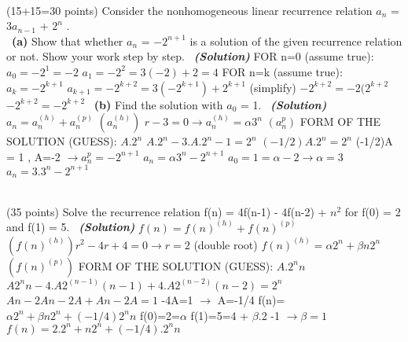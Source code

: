 \documentclass[a4 paper]{article}
\numberwithin{equation}{section}
\newcommand{\problem}[2]{~\\\fbox{\textbf{Problem #1}}\hfill (#2 points)\newline\newline}
\newcommand{\subproblem}[1]{~\newline\textbf{(#1)}}
\newcommand{\solution}{~\newline\textbf{\textit{(Solution)}} }
\newcommand{\0}{\mathbf{0}}
\begin{document}
\problem{1}{15+15=30}
Consider the nonhomogeneous linear recurrence relation $a_n$ = 3$a_{n-1}$ + $2^n$ .\\
\subproblem{a} Show that whether $a_n$ = $-2^{n+1}$ is a solution of the given recurrence relation or not. Show your work step by step.
\solution\newline
FOR n=0  (assume true):\newline
$a_{0} = -2^{1} = -2$ \newline
$a_{1} = -2^{2} = 3(-2) + 2 = 4$ \checkmark\newline
FOR n=k (assume true):\newline
$a_{k} = -2^{k+1}$\newline
$a_{k+1} = -2^{k+2} = 3(-2^{k+1})+2^{k+1}$ (simplify)\newline
$-2^{k+2} = -2(2^{k+2}$\newline
$-2^{k+2} = -2^{k+2}$ \checkmark
\subproblem{b} Find the solution with $a_0$ = 1.
\solution
\newline
$a_n = a_n^{(h)} + a_n^{(p)}$\newline
$(a_n^{(h)})$ $r-3 = 0 \rightarrow a_n^{(h)} =\alpha 3^n$\newline
$(a_n^{p})$ FORM OF THE SOLUTION (GUESS): $A.2^n$\newline
$A.2^n - 3.A.2^n-1=2^n$\newline
$(-1/2)A.2^n = 2^n$\newline
(-1/2)A = 1 , A=-2 $\rightarrow a_n^{p}=-2^{n+1}$\newline
$a_n= \alpha 3^n - 2^{n+1}$\newline
$a_0=1=\alpha -2\rightarrow \alpha=3$\newline
$a_n= 3.3^n - 2^{n+1}$





\problem{2}{35}
Solve the recurrence relation f(n) = 4f(n-1) - 4f(n-2) + $n^2$ for f(0) = 2 and f(1) = 5. 
\solution
\newline
$f(n) = f(n)^{(h)} + f(n)^{(p)}$\newline
$(f(n)^{(h)}) r^2-4r+4 = 0 \rightarrow r=2$ (double root)\newline
$f(n)^{(h)} = \alpha2^n + \beta n 2^n$\newline
$(f(n)^{(p)}) $ FORM OF THE SOLUTION (GUESS): $A.2^nn$\newline
$A2^nn -4.A2^{(n-1)}(n-1) +4.A2^{(n-2)}(n-2) = 2^n $\newline
$An-2An-2A+An-2A = 1$\newline
-4A=1 $\rightarrow$ A=-1/4\newline
f(n)=$\alpha2^n + \beta n 2^n + (-1/4)2^nn$\newline
f(0)=2=$\alpha$\newline
f(1)=5=4 + $\beta$.2 -1 $\rightarrow \beta=1$\newline
$f(n)=2.2^n + n 2^n + (-1/4).2^nn$
\end{document}
